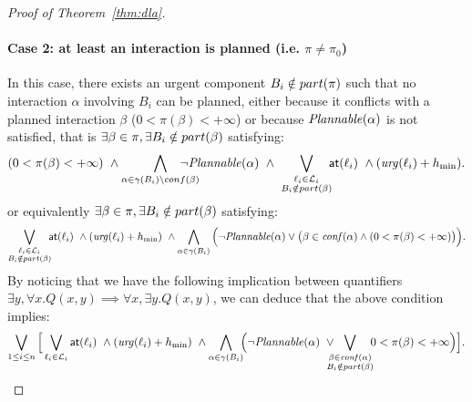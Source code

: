 \begin{proof}[Proof of Theorem~\ref{thm:dla}]
\paragraph*{Case 2: at least an interaction is planned (i.e. $\pi \neq\pi_0$)\\}
In this case, there exists an urgent component $B_i \notin part(\pi)$ such that no interaction 
$\alpha$ involving $B_i$ can be planned, either because it conflicts with a planned interaction 
$\beta$ ($0<\pi(\beta)<+\infty$) or because $\mathit{Plannable(\alpha)}$ is not satisfied, that is 
$\exists\beta\in\pi,\exists B_i\notin part(\beta)$ satisfying:
\begin{displaymath}
  (0<\pi(\beta)<+\infty) \ \wedge\bigwedge_{\substack{\alpha \in \gamma(B_i) \setminus 
  conf(\beta)}} \hspace*{-4ex} \neg\plntxt{\alpha} \ \wedge \ \bigvee_{\substack{\loc_i \in 
  \Loc_i \\ B_i \notin \p{\beta}}} \hspace*{-1ex} \al{\loc_i} \ \wedge(\urg(\loc_i) + \hmin).
\end{displaymath}
or equivalently $\exists\beta\in\pi,\exists B_i\notin part(\beta)$ satisfying:
\begin{displaymath}
  \bigvee_{\substack{\loc_i \in \Loc_i \\ B_i \notin \p{\beta}}} \hspace*{-1ex} \al{\loc_i} \ 
  \wedge(\urg(\loc_i) + \hmin) \ \wedge\bigwedge_{\alpha \in \gamma(B_i) }
 \Big(\neg\plntxt{\alpha}\vee\big(\beta\in\confl(\alpha)\wedge (0<\pi(\beta)<+\infty)\big)\Big) .
\end{displaymath}
By noticing that we have the following implication between quantifiers 
$\exists y,\forall x. Q(x,y)\implies\forall x,\exists y. Q(x,y)$, we can deduce that the 
above condition implies:
\begin{displaymath}
  \bigvee_{1\le i\le n}\Big[\bigvee_{\loc_i \in \Loc_i}\al{\loc_i}\ \wedge(\urg(\loc_i)+\hmin) \
  \wedge\bigwedge_{\alpha \in \gamma(B_i)}\hspace*{-1ex}\Big(  \neg\plntxt{\alpha} \
  \vee\hspace*{-2ex}\bigvee_{\substack{\beta\in\confl(\alpha)\\B_i\notin\p{\beta}}}\hspace*{-1ex}
0<\pi(\beta)<+\infty \Big)\Big].
\end{displaymath}



\end{proof}
